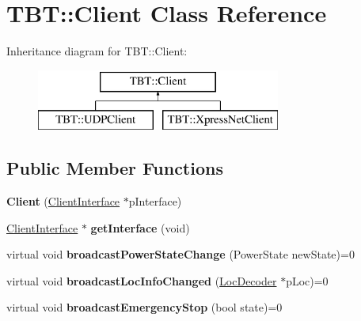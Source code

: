 \hypertarget{classTBT_1_1Client}{}\section{T\+BT\+:\+:Client Class Reference}
\label{classTBT_1_1Client}
Inheritance diagram for T\+BT\+:\+:Client\+:\begin{figure}[H]
\begin{center}
\leavevmode
\includegraphics[height=2.000000cm]{classTBT_1_1Client}
\end{center}
\end{figure}
\subsection*{Public Member Functions}
\begin{DoxyCompactItemize}
\item 
\mbox{\label{classTBT_1_1Client_a6220a6ee1345c62986aea535e2ae202c}} 
{\bfseries Client} (\hyperlink{classTBT_1_1ClientInterface}{Client\+Interface} $\ast$p\+Interface)
\item 
\mbox{\label{classTBT_1_1Client_a37d9a9919aa90879dbf46cf95e519259}} 
\hyperlink{classTBT_1_1ClientInterface}{Client\+Interface} $\ast$ {\bfseries get\+Interface} (void)
\item 
\mbox{\label{classTBT_1_1Client_a399cabd6e0294b7b6a616df0d5ed6821}} 
virtual void {\bfseries broadcast\+Power\+State\+Change} (Power\+State new\+State)=0
\item 
\mbox{\label{classTBT_1_1Client_aeb3b63a37edc6b95872df54a57c27a71}} 
virtual void {\bfseries broadcast\+Loc\+Info\+Changed} (\hyperlink{classTBT_1_1LocDecoder}{Loc\+Decoder} $\ast$p\+Loc)=0
\item 
\mbox{\label{classTBT_1_1Client_ae92e16700112699ee7e591e83341a5e8}} 
virtual void {\bfseries broadcast\+Emergency\+Stop} (bool state)=0
\end{DoxyCompactItemize}

